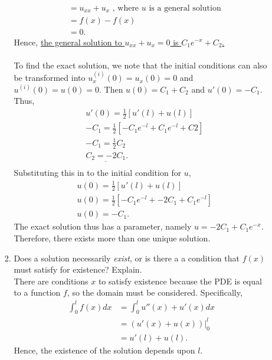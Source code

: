 \documentclass[12pt]{article}%
\begin{document}
\begin{enumerate}
\begin{enumerate}
\begin{enumerate}
\begin{align*}
                    &= u_{xx} + u_{x}  \text{ , where $u$ is a general solution}\\
                    &= f\left(x\right) - f\left(x\right) \\
                    &= 0.
                \end{align*} 
                Hence, \underline{the general solution to $u_{xx} + u_{x} = 0$ is $C_1e^{-x} + C_2$.}  \smallskip \\ \\
                To find the exact solution, we note that the initial conditions can also be transformed into $u^{\left(i\right)}_{x}\left(0\right)=u_{x}\left(0\right)=0$ and $u^{\left(i\right)}\left(0\right) = u\left(0\right) = 0$.  Then $u\left(0\right) = C_1 + C_2$ and $u'\left(0\right)=-C_1$.  Thus,
                \begin{align*}
                    &u'\left(0\right) = \frac{1}{2}\left[ u'\left(l\right) + u\left(l\right) \right] \\
                    &-C_1 = \frac{1}{2}\left[-C_1e^{-l} + C_1e^{-l} + C2\right] \\
                    &-C_1 = \frac{1}{2}C_2 \\
                    &\underline{C_2 = -2C_1}. \\
                \end{align*}
                Substituting this in to the initial condition for $u$, 
                \begin{align*}
                    &u\left(0\right) =\frac{1}{2}\left[u'\left(l\right) + u\left(l\right)\right] \\
                    &u\left(0\right) =\frac{1}{2}\left[-C_1e^{-l} + -2C_1 + C_1e^{-l}\right] \\ 
                    &u\left(0\right) = -C_1.
                \end{align*}
                The exact solution thus has a parameter, namely \underline{$u = -2C_1 + C_1e^{-x}.$} Therefore, there exists more than one unique solution.  \checkmark \smallskip \\
            
            \item Does a solution necessarily \emph{exist}, or is there a a condition that $f\left(x\right)$ must satisfy for existence? Explain. \\
                There are conditions $x$ to satisfy existence because the PDE is equal to a function $f$, so the domain must be considered.  Specifically,
                \begin{align*}
                    \int_0^l f\left(x\right)dx &= \int_0^l{u''\left(x\right) + u'\left(x\right)dx} \\
                    &= \left(u'\left(x\right)  + u\left(x\right)\right)|_0^l \\
                    &= u'\left(l\right)  + u\left(l\right).
                \end{align*}
                Hence, the existence of the solution depends upon $l$.  \checkmark
        \end{enumerate} 
        

\end{enumerate}
\end{enumerate}
\end{document}
